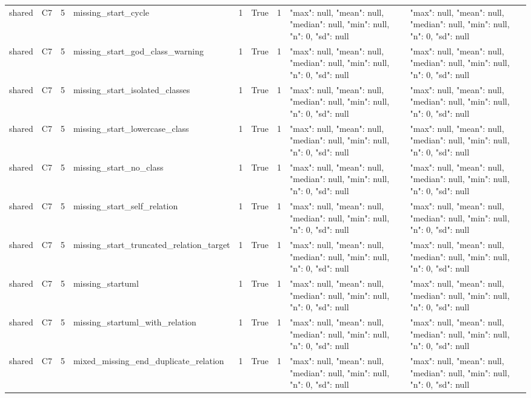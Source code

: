 \begin{tabular}{lllllllll}
shared & C7 & 5 & missing\_start\_cycle & 1 & True & 1 & {"max": null, "mean": null, "median": null, "min": null, "n": 0, "sd": null} & {"max": null, "mean": null, "median": null, "min": null, "n": 0, "sd": null} \\
shared & C7 & 5 & missing\_start\_god\_class\_warning & 1 & True & 1 & {"max": null, "mean": null, "median": null, "min": null, "n": 0, "sd": null} & {"max": null, "mean": null, "median": null, "min": null, "n": 0, "sd": null} \\
shared & C7 & 5 & missing\_start\_isolated\_classes & 1 & True & 1 & {"max": null, "mean": null, "median": null, "min": null, "n": 0, "sd": null} & {"max": null, "mean": null, "median": null, "min": null, "n": 0, "sd": null} \\
shared & C7 & 5 & missing\_start\_lowercase\_class & 1 & True & 1 & {"max": null, "mean": null, "median": null, "min": null, "n": 0, "sd": null} & {"max": null, "mean": null, "median": null, "min": null, "n": 0, "sd": null} \\
shared & C7 & 5 & missing\_start\_no\_class & 1 & True & 1 & {"max": null, "mean": null, "median": null, "min": null, "n": 0, "sd": null} & {"max": null, "mean": null, "median": null, "min": null, "n": 0, "sd": null} \\
shared & C7 & 5 & missing\_start\_self\_relation & 1 & True & 1 & {"max": null, "mean": null, "median": null, "min": null, "n": 0, "sd": null} & {"max": null, "mean": null, "median": null, "min": null, "n": 0, "sd": null} \\
shared & C7 & 5 & missing\_start\_truncated\_relation\_target & 1 & True & 1 & {"max": null, "mean": null, "median": null, "min": null, "n": 0, "sd": null} & {"max": null, "mean": null, "median": null, "min": null, "n": 0, "sd": null} \\
shared & C7 & 5 & missing\_startuml & 1 & True & 1 & {"max": null, "mean": null, "median": null, "min": null, "n": 0, "sd": null} & {"max": null, "mean": null, "median": null, "min": null, "n": 0, "sd": null} \\
shared & C7 & 5 & missing\_startuml\_with\_relation & 1 & True & 1 & {"max": null, "mean": null, "median": null, "min": null, "n": 0, "sd": null} & {"max": null, "mean": null, "median": null, "min": null, "n": 0, "sd": null} \\
shared & C7 & 5 & mixed\_missing\_end\_duplicate\_relation & 1 & True & 1 & {"max": null, "mean": null, "median": null, "min": null, "n": 0, "sd": null} & {"max": null, "mean": null, "median": null, "min": null, "n": 0, "sd": null} \\

\end{tabular}
